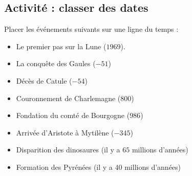 
\subsection*{Activité : classer des dates}

Placer les événements suivants sur une ligne du temps :
\begin{itemize}
    \item Le premier pas sur la Lune (\( 1969\)).
    \item La conquête des Gaules (\( -51\))
    \item Décès de Catule (\( -54\))
    \item Couronnement de Charlemagne (\( 800\))
    \item Fondation du comté de Bourgogne (\( 986\))
    \item Arrivée d'Aristote à Mytilène (\( -345\))
    \item Disparition des dinosaures (il y a \( 65\) millions d'années)
    \item Formation des Pyrénées (il y a \( 40\) millions d'années)
\end{itemize}
